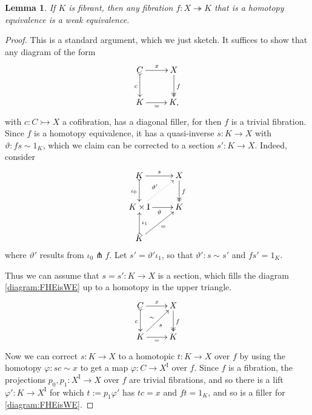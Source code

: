 \documentclass[11pt]{amsart}
\newcommand{\mono}{\ensuremath{\rightarrowtail}}
\newcommand{\ra}{\ensuremath{\rightarrow}}
\newcommand{\onto}{\ensuremath{\twoheadrightarrow}}
\newcommand{\I}{\ensuremath{\mathrm{I}}}
\newtheorem{lemma}[theorem]{Lemma}
\theoremstyle{remark}
\theoremstyle{definition}
\begin{document}
\begin{lemma}\label{FibHETFib}
If $K$ is fibrant, then any fibration $f : X \onto K$ that is a homotopy equivalence is a weak equivalence.
\end{lemma}
\begin{proof}
This is a standard argument, which we just sketch.  It suffices to show that any diagram of the form
\begin{equation}\label{diagram:FHEisWE}
\xymatrix{
C \ar@{>->}[d]_{c} \ar[r]^x & X \ar@{>>}[d]^{f} \\
K\ar[r]_{=} & K,
}
\end{equation}
with  $c : C \mono X$  a cofibration, has a diagonal filler, for then $f$ is a trivial fibration.  
Since $f$ is a homotopy equivalence, it has a quasi-inverse $s:K\ra X$ with $\vartheta : fs\sim 1_K$, which we claim can be corrected to a section $s' : K\ra X$. 
Indeed, consider 
\begin{equation*}%
\xymatrix{
K \ar@{>->}[d]_{\iota_0} \ar[r]^{s}  & X\ar@{>>}[d]^{f} \\
K\times \I \ar[r]_{\vartheta} \ar@{..>}[ru]^{\vartheta'}& K\\
K \ar@{>->}[u]_{\iota_1} \ar[ru]_=&
}
\end{equation*}
where $\vartheta' $ results from $\iota_0 \pitchfork f$. Let $s' = \vartheta' \iota_1$, so that $\vartheta' : s\sim s'$ and $fs' = 1_K$.

Thus we can assume that $s = s' : K\ra X$ is a section, which fills the diagram \eqref{diagram:FHEisWE} up to a homotopy in the upper triangle.
\begin{equation*}%
\xymatrix{
C \ar@{>->}[d]_{c} \ar[r]^x & X \ar@{>>}[d]^{f} \\
K\ar[r]_{=} \ar[ru]_{s}^{\sim} & K
}
\end{equation*}
Now we can correct $s: K\ra X$ to a homotopic $t : K\ra X$ over $f$ by using the homotopy $\varphi : sc\sim x$  to get a map $\varphi : C\ra X^\I$ over $f$.  Since $f$ is a fibration, the projections $p_0, p_1:X^\I \ra X$ over $f$ are trivial fibrations, and so there is a lift $\varphi': K\ra X^\I$ for which $t:= p_1\varphi'$ has $tc= x$ and $ft=1_K$, and so is a filler for \eqref{diagram:FHEisWE}.
\end{proof}
\end{document}
